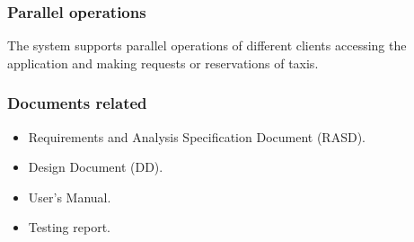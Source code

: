 \documentclass[18pt,oneside,a4paper, titlepage]{article}
\begin{document}
		\subsubsection{Parallel operations}
			The system supports parallel operations of different clients accessing the application and making requests or reservations of taxis.
		
		\subsubsection{Documents related}
			\begin{itemize}
				\item Requirements and Analysis Specification Document (RASD).
				\item Design Document (DD).
				\item User's Manual.
				\item Testing report.
			\end{itemize}
		
\end{document}
